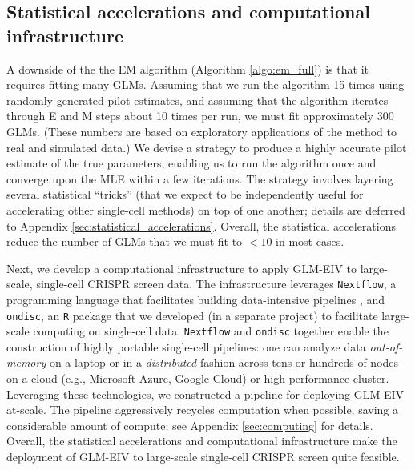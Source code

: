 \documentclass[12pt]{article}
\begin{document}
\subsection{Statistical accelerations and computational infrastructure}
A downside of the the EM algorithm (Algorithm \ref{algo:em_full}) is that it requires fitting many GLMs. Assuming that we run the algorithm 15 times using randomly-generated pilot estimates, and assuming that the algorithm iterates through E and M steps about 10 times per run, we must fit approximately 300 GLMs. (These numbers are based on exploratory applications of the method to real and simulated data.) We devise a strategy to produce a highly accurate pilot estimate of the true parameters, enabling us to run the algorithm once and converge upon the MLE within a few iterations. The strategy involves layering several statistical ``tricks'' (that we expect to be independently useful for accelerating other single-cell methods) on top of one another; details are deferred to Appendix \ref{sec:statistical_accelerations}. Overall, the statistical accelerations reduce the number of GLMs that we must fit to $<10$ in most cases.

Next, we develop a computational infrastructure to apply GLM-EIV to large-scale, single-cell CRISPR screen data. The infrastructure leverages \texttt{Nextflow}, a programming language that facilitates building data-intensive pipelines \parencite{DITommaso2017}, and \texttt{ondisc}, an \texttt{R} package that we developed (in a separate project) to facilitate large-scale computing on single-cell data. \texttt{Nextflow} and \texttt{ondisc} together enable the construction of highly portable single-cell pipelines: one can analyze data \textit{out-of-memory} on a laptop or in a \textit{distributed} fashion across tens or hundreds of nodes on a cloud (e.g., Microsoft Azure, Google Cloud) or high-performance cluster. Leveraging these technologies, we constructed a pipeline for deploying GLM-EIV at-scale. The pipeline aggressively recycles computation when possible, saving a considerable amount of compute; see Appendix \ref{sec:computing} for details. Overall, the statistical accelerations and computational infrastructure make the deployment of GLM-EIV to large-scale single-cell CRISPR screen quite feasible.
\end{document}

